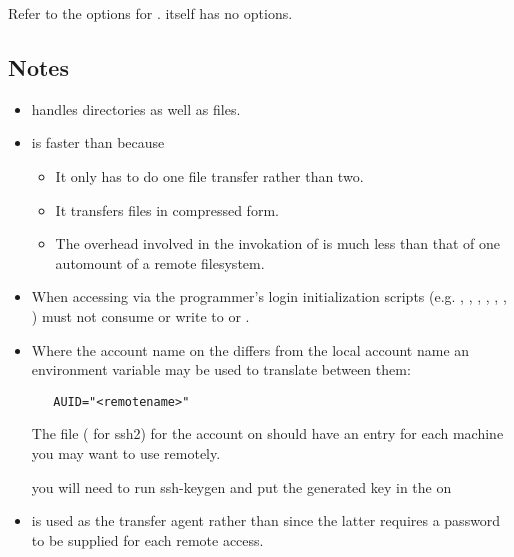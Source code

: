 Refer to the options for .   itself has no options.
 
\subsection*{Notes}
 
\begin{itemize}
\item
    handles directories as well as files.
 
\item
    is faster than  because
 
   \begin{itemize}
   \item
      It only has to do one file transfer rather than two.
 
   \item
      It transfers files in compressed form.
 
   \item
      The overhead involved in the invokation of  is much less
      than that of one automount of a remote filesystem.
   \end{itemize}
 
\item
   When accessing  via  the programmer's
   login initialization scripts (e.g. , ,
   , , , , )
   must not consume  or write to  or .
 
\item
   Where the account name on the  differs from the local
   account name an environment variable may be used to translate between them:
 
\begin{verbatim}
   AUID="<remotename>"
\end{verbatim}
 
   \noindent
   The  file   ( for ssh2)
   for the  account on
    should have an entry for each machine you may want
   to use remotely.

   \noindent
   you will need to run ssh-keygen and put the generated key in the 
    on 
 
\item
    is used as the transfer agent rather than  since
   the latter requires a password to be supplied for each remote access.


\end{itemize}
